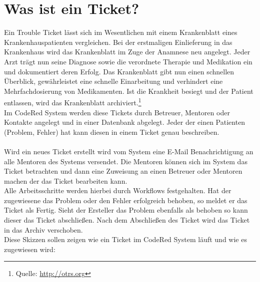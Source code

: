 \chapter{Was ist ein Ticket?}  %
\label{chapter:Was ist ein Ticket?}  %

Ein Trouble Ticket lässt sich im Wesentlichen mit einem Krankenblatt eines Krankenhauspatienten vergleichen. Bei der erstmaligen Einlieferung in das Krankenhaus wird das Krankenblatt im Zuge der Anamnese neu angelegt. Jeder Arzt trägt nun seine Diagnose sowie die verordnete Therapie und Medikation ein und dokumentiert deren Erfolg. Das Krankenblatt gibt nun einen schnellen Überblick, gewährleistet eine schnelle Einarbeitung und verhindert eine Mehrfachdosierung von Medikamenten. Ist die Krankheit besiegt und der Patient entlassen, wird das Krankenblatt archiviert.\footnotemark[1]
\footnote[1]{Quelle: \href{http://otrs.org/}{http://otrs.org} }
\\
Im CodeRed System werden diese Tickets durch Betreuer, Mentoren oder Kontakte angelegt und in einer Datenbank abgelegt. Jeder der einen Patienten (Problem, Fehler) hat kann diesen in einem Ticket genau beschreiben.\\
\\
Wird ein neues Ticket erstellt wird vom System eine E-Mail Benachrichtigung an alle Mentoren des Systems versendet. Die Mentoren können sich im System das Ticket betrachten und dann eine Zuweisung an einen Betreuer oder Mentoren machen der das Ticket bearbeiten kann. \\
Alle Arbeitsschritte werden hierbei durch Workflows festgehalten. Hat der zugewiesene das Problem oder den Fehler erfolgreich behoben, so meldet er das Ticket als \qquad Fertig\qquad. Sieht der Ersteller das Problem ebenfalls als behoben so kann dieser das Ticket abschließen. Nach dem Abschließen des Ticket wird das Ticket in das Archiv verschoben.
\\
\newpage
Diese Skizzen sollen zeigen wie ein Ticket im CodeRed System läuft und wie es zugewiesen wird:\\

